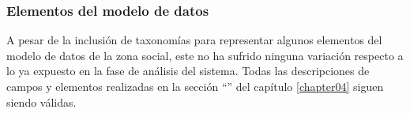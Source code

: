 \subsubsection{Elementos del modelo de datos}
A pesar de la inclusión de taxonomías para representar algunos elementos del modelo de datos de la zona social, este no ha sufrido ninguna variación respecto a lo ya expuesto en la fase de análisis del sistema. Todas las descripciones de campos y elementos realizadas en la sección ``'' del capítulo \ref{chapter04} siguen siendo válidas.